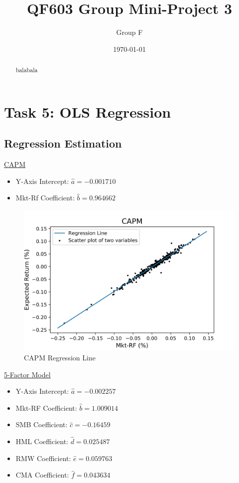 \documentclass[a4paper]{article}
\title{QF603 Group Mini-Project 3}
\author{Group F}
\date{\today}
\begin{document}
	\maketitle
	
	\begin{abstract}
	\vspace{6pt}
		balabala
	\end{abstract}

\newpage
\setcounter{secnumdepth}{1}
\section*{Task 5: OLS Regression}
\label{sec:introduction}

\subsection{Regression Estimation}
\underline{CAPM}
\begin{itemize}[nosep]
	\item Y-Axis Intercept: $\hat{a}= -0.001710$
	\item Mkt-Rf Coefficient: $\hat{b}=0.964662$
\end{itemize}

\begin{figure}[ht]
	\centering
	\includegraphics[width=\linewidth, frame]{CAPM_regression.jpeg}
	\captionsetup{font=small}
	\caption{CAPM Regression Line}
\end{figure}

\underline{5-Factor Model}
\begin{itemize}[nosep]
	\item Y-Axis Intercept: $\hat{a} = -0.002257$
	\item Mkt-RF Coefficient: $\hat{b} = 1.009014$
	\item SMB Coefficient: $\hat{c} = -0.16459$
	\item HML Coefficient: $\hat{d} = 0.025487$
	\item RMW Coefficient: $\hat{e} = 0.059763$
	\item CMA Coefficient: $\hat{f} = 0.043634$
\end{itemize}
\end{document}
